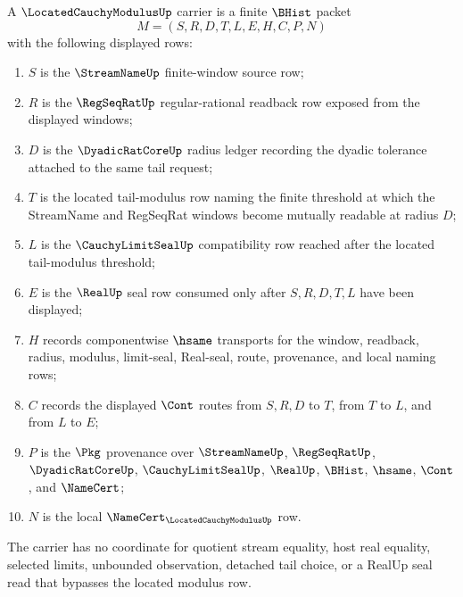 \begin{definition}
\label{def:located-cauchy-modulus-carrier}
A $\LocatedCauchyModulusUp$ carrier is a finite $\BHist$ packet
$$
M=(S,R,D,T,L,E,H,C,P,N)
$$
with the following displayed rows:
\begin{enumerate}
\item $S$ is the $\StreamNameUp$ finite-window source row;
\item $R$ is the $\RegSeqRatUp$ regular-rational readback row exposed from the displayed windows;
\item $D$ is the $\DyadicRatCoreUp$ radius ledger recording the dyadic tolerance attached to the same tail request;
\item $T$ is the located tail-modulus row naming the finite threshold at which the StreamName and RegSeqRat windows become mutually readable at radius $D$;
\item $L$ is the $\CauchyLimitSealUp$ compatibility row reached after the located tail-modulus threshold;
\item $E$ is the $\RealUp$ seal row consumed only after $S,R,D,T,L$ have been displayed;
\item $H$ records componentwise $\hsame$ transports for the window, readback, radius, modulus, limit-seal, Real-seal, route, provenance, and local naming rows;
\item $C$ records the displayed $\Cont$ routes from $S,R,D$ to $T$, from $T$ to $L$, and from $L$ to $E$;
\item $P$ is the $\Pkg$ provenance over $\StreamNameUp$, $\RegSeqRatUp$, $\DyadicRatCoreUp$, $\CauchyLimitSealUp$, $\RealUp$, $\BHist$, $\hsame$, $\Cont$, and $\NameCert$;
\item $N$ is the local $\NameCert_{\LocatedCauchyModulusUp}$ row.
\end{enumerate}
The carrier has no coordinate for quotient stream equality, host real equality, selected limits, unbounded observation, detached tail choice, or a RealUp seal read that bypasses the located modulus row.
\end{definition}

